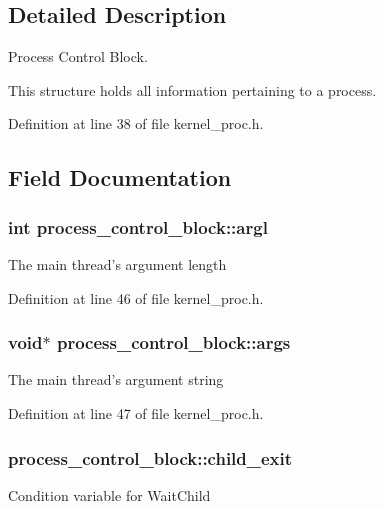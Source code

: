\subsection{Detailed Description}
Process Control Block. 

This structure holds all information pertaining to a process. 

Definition at line 38 of file kernel\-\_\-proc.\-h.



\subsection{Field Documentation}
\hypertarget{structprocess__control__block_a8c8667a0f61f4380b3d5c69c57315511}{
\subsubsection[{argl}]{\setlength{\rightskip}{0pt plus 5cm}int process\-\_\-control\-\_\-block\-::argl}}\label{structprocess__control__block_a8c8667a0f61f4380b3d5c69c57315511}
The main thread's argument length 

Definition at line 46 of file kernel\-\_\-proc.\-h.

\hypertarget{structprocess__control__block_af7ac33b69a8a1dc582e0fa35cc90568a}{
\subsubsection[{args}]{\setlength{\rightskip}{0pt plus 5cm}void$\ast$ process\-\_\-control\-\_\-block\-::args}}\label{structprocess__control__block_af7ac33b69a8a1dc582e0fa35cc90568a}
The main thread's argument string 

Definition at line 47 of file kernel\-\_\-proc.\-h.

\hypertarget{structprocess__control__block_a6bcb52e96fdf96d060af2b11f07d44bd}{
\subsubsection[{child\-\_\-exit}]{ process\-\_\-control\-\_\-block\-::child\-\_\-exit}}\label{structprocess__control__block_a6bcb52e96fdf96d060af2b11f07d44bd}
Condition variable for {\ttfamily Wait\-Child} 

